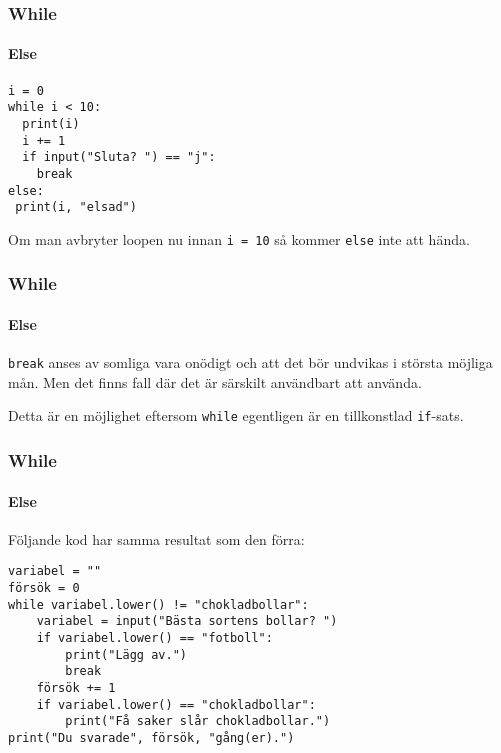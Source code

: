 \documentclass{beamer}
\begin{document}
\begin{frame}[fragile]
\frametitle{While}
\framesubtitle{Else}

\begin{lstlisting}
i = 0
while i < 10:
  print(i)
  i += 1
  if input("Sluta? ") == "j":
    break
else:
 print(i, "elsad")
\end{lstlisting}

Om man avbryter loopen nu innan \texttt{i = 10} så kommer \texttt{else} inte att hända.

\end{frame}

\begin{frame}[fragile]
\frametitle{While}
\framesubtitle{Else}

\texttt{break} anses av somliga vara onödigt och att det bör undvikas i största möjliga mån. Men det finns fall där det är särskilt användbart att använda.



\pause

Detta är en möjlighet eftersom \texttt{while} egentligen är en tillkonstlad \texttt{if}-sats.

\end{frame}

\begin{frame}[fragile]
\frametitle{While}
\framesubtitle{Else}

Följande kod har samma resultat som den förra:

\begin{lstlisting}
variabel = ""
försök = 0
while variabel.lower() != "chokladbollar":
    variabel = input("Bästa sortens bollar? ")
    if variabel.lower() == "fotboll":
        print("Lägg av.")
        break
    försök += 1 
    if variabel.lower() == "chokladbollar":
        print("Få saker slår chokladbollar.")
print("Du svarade", försök, "gång(er).")
\end{lstlisting}

\end{frame}
\end{document}
